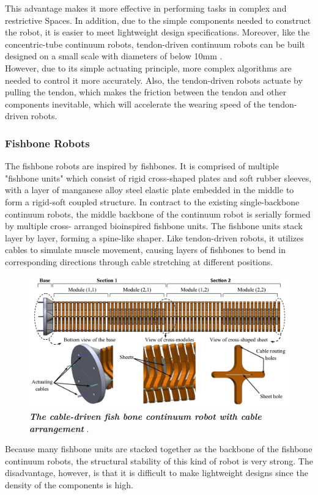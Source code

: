 This advantage makes it more effective in performing tasks in complex and restrictive Spaces. In addition, due to the simple 
components needed to construct the robot, it is easier to meet lightweight design specifications. Moreover, like the 
concentric-tube continuum robots, tendon-driven continuum robots can be built designed on a small scale with diameters of 
below 10mm \cite{amanov2021tendon}. \\
However, due to its simple actuating principle, more complex algorithms are needed to control it more accurately. Also, the 
tendon-driven robots actuate by pulling the tendon, which makes the friction between the tendon and other components inevitable, 
which will accelerate the wearing speed of the tendon-driven robots.
\subsubsection{Fishbone Robots}
The fishbone robots are inspired by fishbones. It is comprised of multiple "fishbone units" which consist of rigid cross-shaped 
plates and soft rubber sleeves, with a layer of manganese alloy steel elastic plate embedded in the middle to form a rigid-soft 
coupled structure\cite{fishboneCR}. In contract to the existing single-backbone continuum robots, the middle backbone of the 
continuum robot is serially formed by multiple cross- arranged bioinspired fishbone units.  The fishbone units stack layer by 
layer, forming a spine-like shaper. Like tendon-driven robots, it utilizes cables to simulate muscle movement, causing layers 
of fishbones to bend in corresponding directions through cable stretching at different positions. 
\begin{figure}[H] %
    \centering %
    \captionsetup{labelsep=colon}
    \includegraphics[width=.9\textwidth]{Image/LR/fishbone_CR_amouri2023bio.PNG} 
    \caption[The cable-driven fish bone continuum robot]
    {\centering \textit{\textbf{The cable-driven fish bone continuum robot with cable arrangement}} \cite{amouri2023bio}.}
    \label{fig:fishboneCR_2023bio}
\end{figure}
\noindent Because many fishbone units are stacked together as the backbone of the fishbone continuum robots, the structural 
stability of this kind of robot is very strong. The disadvantage, however, is that it is difficult to make lightweight designs 
since the density of the components is high.
